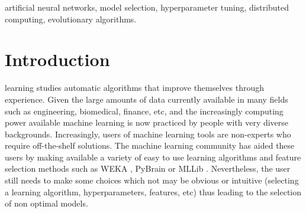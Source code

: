 \documentclass[journal]{IEEEtran}
\begin{document}
\begin{IEEEkeywords}
artificial neural networks, model selection, hyperparameter tuning, distributed computing, evolutionary algorithms.
\end{IEEEkeywords}






%



\section{Introduction}
% 
% 
% 
% 
 learning studies automatic algorithms that improve themselves through experience. Given the large amounts of data currently available in many fields such as engineering, biomedical, finance, etc, and the increasingly computing power available machine learning is now  practiced by people with very diverse backgrounds. Increasingly, users of machine learning tools are non-experts who require off-the-shelf solutions. The machine learning community has aided these users by making available a variety of easy to use learning algorithms and feature selection methods such as WEKA \cite{Hall2009}, PyBrain \cite{Schaul2010} or MLLib \cite{mlib2017}. Nevertheless, the user still needs to make some choices which not may be obvious or intuitive (selecting a learning algorithm, hyperparameters, features, etc) thus leading to the selection of non optimal models.
\end{document}
